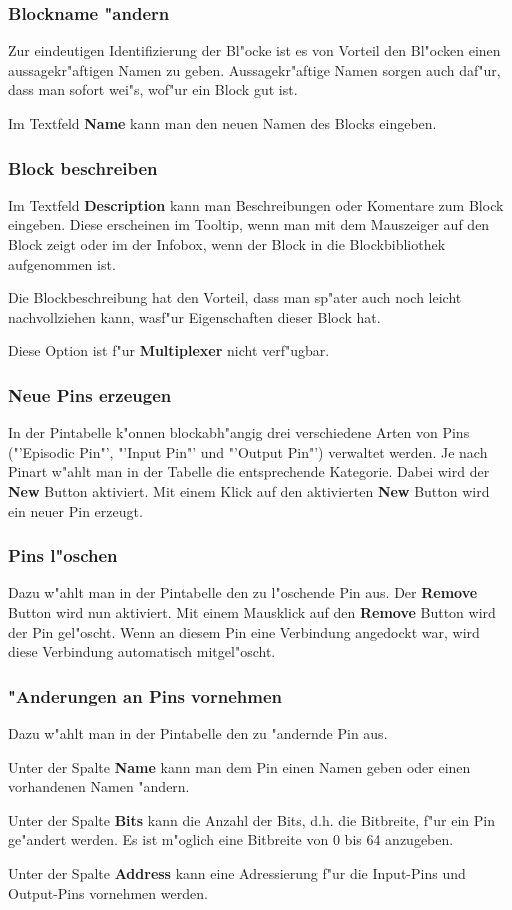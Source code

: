 \documentclass[a4paper,titlepage,12pt,ngerman]{scrbook}
\begin{document}
\subsubsection{Blockname "andern}
Zur eindeutigen Identifizierung der Bl"ocke ist es von Vorteil den Bl"ocken einen aussagekr"aftigen Namen zu geben. Aussagekr"aftige Namen sorgen auch daf"ur, dass man sofort wei"s, wof"ur ein Block gut ist. \par
Im Textfeld {\bf Name} kann man den neuen Namen des Blocks eingeben.
\subsubsection{Block beschreiben}
Im Textfeld {\bf Description} kann man Beschreibungen oder Komentare zum Block eingeben. Diese erscheinen im Tooltip, wenn man mit dem Mauszeiger auf den Block zeigt oder im der Infobox, wenn der Block in die Blockbibliothek aufgenommen ist.\par
Die Blockbeschreibung hat den Vorteil, dass man sp"ater auch noch leicht nachvollziehen kann, wasf"ur Eigenschaften dieser Block hat.\par
Diese Option ist f"ur {\bf Multiplexer} nicht verf"ugbar.
\subsubsection{Neue Pins erzeugen}
In der Pintabelle k"onnen blockabh"angig drei verschiedene Arten von Pins ("'Episodic Pin"', "'Input Pin"' und "'Output Pin"') verwaltet werden. Je nach Pinart w"ahlt man in der Tabelle die entsprechende Kategorie. Dabei wird der {\bf New} Button aktiviert. Mit einem Klick auf den aktivierten {\bf New} Button wird ein neuer Pin erzeugt. \par
\subsubsection{Pins l"oschen}
Dazu w"ahlt man in der Pintabelle den zu l"oschende Pin aus. Der {\bf Remove} Button wird nun aktiviert. Mit einem Mausklick auf den {\bf Remove} Button wird der Pin gel"oscht. Wenn an diesem Pin eine Verbindung angedockt war, wird diese Verbindung automatisch mitgel"oscht.
\subsubsection{"Anderungen an Pins vornehmen}
Dazu w"ahlt man in der Pintabelle den zu "andernde Pin aus.\par
Unter der Spalte {\bf Name} kann man dem Pin einen Namen geben oder einen vorhandenen Namen "andern.\par
Unter der Spalte {\bf Bits} kann die Anzahl der Bits, d.h. die Bitbreite, f"ur ein Pin ge"andert werden. Es ist m"oglich eine Bitbreite von 0 bis 64 anzugeben.\par
Unter der Spalte {\bf Address} kann eine Adressierung f"ur die Input-Pins und Output-Pins vornehmen werden.\par
\end{document}
